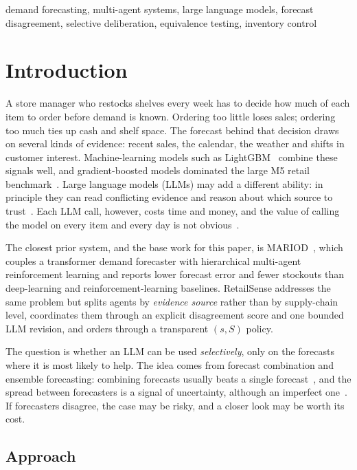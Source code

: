 \documentclass[conference]{IEEEtran}
\begin{document}
\begin{IEEEkeywords}
demand forecasting, multi-agent systems, large language models, forecast disagreement, selective
deliberation, equivalence testing, inventory control
\end{IEEEkeywords}

\section{Introduction}

A store manager who restocks shelves every week has to decide how much of each item to order
before demand is known. Ordering too little loses sales; ordering too much ties up cash and shelf
space. The forecast behind that decision draws on several kinds of evidence: recent sales, the
calendar, the weather and shifts in customer interest. Machine-learning models such as
LightGBM~\cite{ke2017} combine these signals well, and gradient-boosted models dominated the large
M5 retail benchmark~\cite{makridakis2022}. Large language models (LLMs) may add a different
ability: in principle they can read conflicting evidence and reason about which source to
trust~\cite{du2024}. Each LLM call, however, costs time and money, and the value of calling the
model on every item and every day is not obvious~\cite{tan2024}.

The closest prior system, and the base work for this paper, is MARIOD~\cite{yang2025}, which couples
a transformer demand forecaster with hierarchical multi-agent reinforcement learning and reports
lower forecast error and fewer stockouts than deep-learning and reinforcement-learning baselines.
RetailSense addresses the same problem but splits agents by \emph{evidence source} rather than by
supply-chain level, coordinates them through an explicit disagreement score and one bounded LLM
revision, and orders through a transparent $(s,S)$ policy.

The question is whether an LLM can be used \emph{selectively}, only on the forecasts where it is
most likely to help. The idea comes from forecast combination and ensemble forecasting: combining
forecasts usually beats a single forecast~\cite{bates1969,timmermann2006,wang2023}, and the spread
between forecasters is a signal of uncertainty, although an imperfect
one~\cite{zarnowitz1987,whitaker1998}. If forecasters disagree, the case may be risky, and a
closer look may be worth its cost.

\subsection{Approach}
\end{document}
